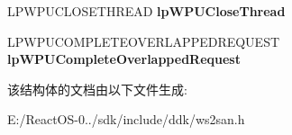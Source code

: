 \begin{DoxyCompactItemize}
\mbox{\label{struct___w_s_p_u_p_c_a_l_l_t_a_b_l_e_e_x_a9095b1662ecfe096091ba9668a444d68}} 
L\+P\+W\+P\+U\+C\+L\+O\+S\+E\+T\+H\+R\+E\+AD {\bfseries lp\+W\+P\+U\+Close\+Thread}
\item 
\mbox{\label{struct___w_s_p_u_p_c_a_l_l_t_a_b_l_e_e_x_a1dc20d1821f1fb01051c529ada66bfdb}} 
L\+P\+W\+P\+U\+C\+O\+M\+P\+L\+E\+T\+E\+O\+V\+E\+R\+L\+A\+P\+P\+E\+D\+R\+E\+Q\+U\+E\+ST {\bfseries lp\+W\+P\+U\+Complete\+Overlapped\+Request}
\end{DoxyCompactItemize}


该结构体的文档由以下文件生成\+:\begin{DoxyCompactItemize}
\item 
E\+:/\+React\+O\+S-\/0../sdk/include/ddk/ws2san.\+h\end{DoxyCompactItemize}
